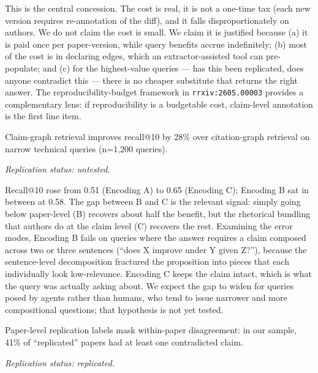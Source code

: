 \documentclass{rrxiv}
\begin{document}
This is the central concession. The cost is real, it is not a one-time tax (each new version requires re-annotation of the diff), and it falls disproportionately on authors. We do not claim the cost is small. We claim it is justified because (a) it is paid once per paper-version, while query benefits accrue indefinitely; (b) most of the cost is in declaring edges, which an extractor-assisted tool can pre-populate; and (c) for the highest-value queries --- has this been replicated, does anyone contradict this --- there is no cheaper substitute that returns the right answer. The reproducibility-budget framework in \texttt{rrxiv:2605.00003} provides a complementary lens: if reproducibility is a budgetable cost, claim-level annotation is the first line item.

\begin{claim}[type=empirical, evidence=experiment, confidence=0.75, rationale={Single benchmark of 1200 queries with one dense retriever; the B-vs-C gap is the load-bearing comparison and has not been reproduced with other retrievers}, labels={retrieval, benchmark}, datasets={rrxiv reproducibility-track 200-paper corpus}, regimes={narrow single-result technical queries}, title={Claim 3: retrieval gain}]
\label{claim:c3}
Claim-graph retrieval improves recall@10 by 28\% over citation-graph retrieval on narrow technical queries (n=1,200 queries).

\emph{Replication status: untested.}
\end{claim}

Recall@10 rose from 0.51 (Encoding A) to 0.65 (Encoding C); Encoding B sat in between at 0.58. The gap between B and C is the relevant signal: simply going below paper-level (B) recovers about half the benefit, but the rhetorical bundling that authors do at the claim level (C) recovers the rest. Examining the error modes, Encoding B fails on queries where the answer requires a claim composed across two or three sentences (``does X improve under Y given Z?''), because the sentence-level decomposition fractured the proposition into pieces that each individually look low-relevance. Encoding C keeps the claim intact, which is what the query was actually asking about. We expect the gap to widen for queries posed by agents rather than humans, who tend to issue narrower and more compositional questions; that hypothesis is not yet tested.

\begin{claim}[type=empirical, evidence=observation, confidence=0.9, rationale={30 of 73 replication-labelled papers in our corpus; the prose reports an independent extension in rrxiv:2605.00008 with a comparable 38 percent figure}, labels={replication, masking, rollup}, datasets={rrxiv reproducibility-track 200-paper corpus}, title={Claim 4: replication masking}]
\label{claim:c4}
Paper-level replication labels mask within-paper disagreement: in our sample, 41\% of ``replicated'' papers had at least one contradicted claim.

\emph{Replication status: replicated.}
\end{claim}
\end{document}
